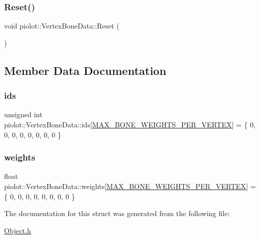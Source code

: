 \subsubsection{\texorpdfstring{Reset()}{Reset()}}
{\footnotesize\ttfamily void piolot\+::\+Vertex\+Bone\+Data\+::\+Reset (\begin{DoxyParamCaption}{ }\end{DoxyParamCaption})\hspace{0.3cm}{\ttfamily [inline]}}



\subsection{Member Data Documentation}
\mbox{\label{structpiolot_1_1_vertex_bone_data_a109f771b8096564ebd8011d3444e52b1}} 
\subsubsection{\texorpdfstring{ids}{ids}}
{\footnotesize\ttfamily unsigned int piolot\+::\+Vertex\+Bone\+Data\+::ids\mbox{[}\mbox{\hyperlink{_object_8h_ab50eab88f228256df8f255a597fadaf1}{M\+A\+X\+\_\+\+B\+O\+N\+E\+\_\+\+W\+E\+I\+G\+H\+T\+S\+\_\+\+P\+E\+R\+\_\+\+V\+E\+R\+T\+EX}}\mbox{]} = \{ 0, 0, 0, 0, 0, 0, 0, 0 \}}

\mbox{\label{structpiolot_1_1_vertex_bone_data_a09ed8f4a42757f4708c1ed3672fbe2d1}} 
\subsubsection{\texorpdfstring{weights}{weights}}
{\footnotesize\ttfamily float piolot\+::\+Vertex\+Bone\+Data\+::weights\mbox{[}\mbox{\hyperlink{_object_8h_ab50eab88f228256df8f255a597fadaf1}{M\+A\+X\+\_\+\+B\+O\+N\+E\+\_\+\+W\+E\+I\+G\+H\+T\+S\+\_\+\+P\+E\+R\+\_\+\+V\+E\+R\+T\+EX}}\mbox{]} = \{ 0, 0, 0, 0, 0, 0, 0, 0 \}}



The documentation for this struct was generated from the following file\+:\begin{DoxyCompactItemize}
\item 
\mbox{\hyperlink{_object_8h}{Object.\+h}}\end{DoxyCompactItemize}

